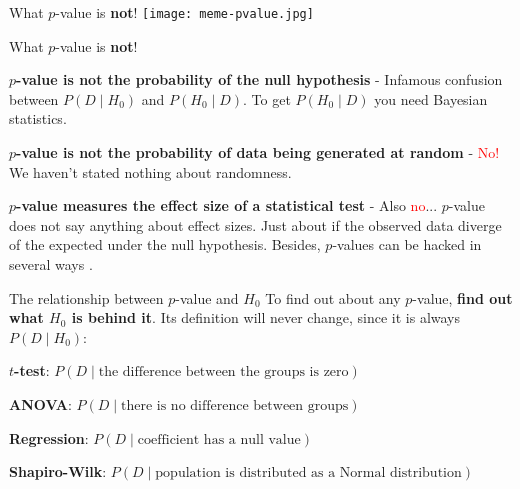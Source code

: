 \begin{frame}{What $p$-value is \textbf{not}!}
	\centering
	\texttt{[image: meme-pvalue.jpg]}
\end{frame}

\begin{frame}{What $p$-value is \textbf{not}!}
	\begin{vfilleditems}
		\item \textbf{$p$-value is not the probability of the null hypothesis}
		- Infamous confusion between $P(D \mid H_0)$ and $P(H_0 \mid D)$.
		To get $P(H_0 \mid D)$ you need Bayesian statistics.
		\item \textbf{$p$-value is not the probability of data being generated at random}
		- \textcolor{red}{No!}
		We haven't stated nothing about randomness.
		\item \textbf{$p$-value measures the effect size of a statistical test}
		- Also \textcolor{red}{no}... $p$-value does not say anything about effect sizes.
		Just about if the observed data diverge of the expected under the null hypothesis.
		Besides, $p$-values can be hacked in several ways \parencite{head2015extent}.
	\end{vfilleditems}
\end{frame}

\begin{frame}{The relationship between $p$-value and $H_0$}
	To find out about any $p$-value, \textbf{find out what $H_0$ is behind it}.
	Its definition will never change, since it is always $P(D \mid H_0)$:
	\begin{vfilleditems}
		\item \textbf{$t$-test}: $P(D \mid \text{the difference between the groups is zero})$ \item \textbf{ANOVA}: $P(D \mid \text{there is no difference between groups})$ \item \textbf{Regression}: $P(D \mid \text{coefficient has a null value})$ \item \textbf{Shapiro-Wilk}: $P(D \mid \text{population is distributed as a Normal distribution})$
	\end{vfilleditems}
\end{frame}

